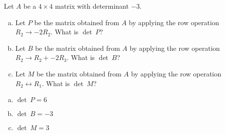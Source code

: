 
\begin{exerciseStatement}


Let \(A\) be a \(4 \times 4\) matrix with determinant \( -3 \).


\begin{enumerate}[(a)]
\item Let \(P\) be the matrix obtained from \(A\) by applying the row operation \( R_2 \to -2R_2 \). What is \(\operatorname{det}\ P\)?
\item Let \(B\) be the matrix obtained from \(A\) by applying the row operation \( R_2 \to R_2 + -2R_3 \). What is \(\operatorname{det}\ B\)?
\item Let \(M\) be the matrix obtained from \(A\) by applying the row operation \( R_2 \leftrightarrow R_1 \). What is \(\operatorname{det}\ M\)?
\end{enumerate}
    
\end{exerciseStatement}
    
\begin{exerciseAnswer} 

\begin{enumerate}[(a)]
\item \(\operatorname{det}\ P= 6 \)
\item \(\operatorname{det}\ B= -3 \)
\item \(\operatorname{det}\ M= 3 \)
\end{enumerate}
    
\end{exerciseAnswer}
    
